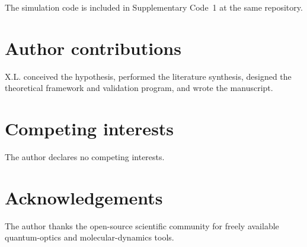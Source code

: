 \documentclass[11pt,a4paper]{article}
\begin{document}
The simulation code is included in Supplementary Code~1 at the same repository.

\section*{Author contributions}

X.L. conceived the hypothesis, performed the literature synthesis, designed the theoretical framework and validation program, and wrote the manuscript.

\section*{Competing interests}

The author declares no competing interests.

\section*{Acknowledgements}

The author thanks the open-source scientific community for freely available quantum-optics and molecular-dynamics tools.
\end{document}
